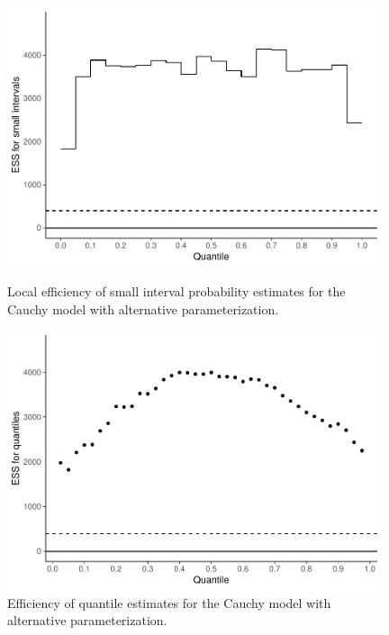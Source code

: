 \documentclass[american,]{article}
\theoremstyle{definition}
\begin{document}
\begin{figure}[tp]
  \centering
  \begin{minipage}{0.48\textwidth}
  \includegraphics[width=0.98\textwidth]{graphics/local-ess-fit-alt1-1.pdf}
  \caption{Local efficiency of small interval probability estimates for the 
  Cauchy model with alternative parameterization.}
\label{fig:local-ess-fit-alt1-1}
\end{minipage}
\hfill
  \begin{minipage}{0.48\textwidth}
  \includegraphics[width=0.98\textwidth]{graphics/quantile-ess-fit-alt1-1.pdf}
  \caption{Efficiency of quantile estimates for the Cauchy model with 
  alternative parameterization.\\~}
  \label{fig:quantile-ess-alt1-1}
\end{minipage}
\end{figure}
\end{document}
